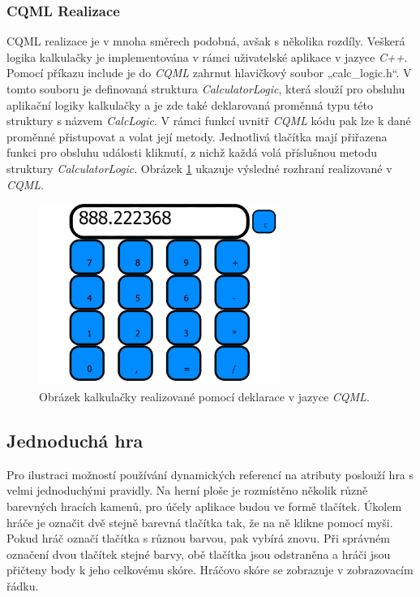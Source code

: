 \documentclass[11pt,twoside,a4paper]{book}
\begin{document}
\subsubsection{CQML Realizace}
CQML realizace je v mnoha směrech podobná, avšak s několika rozdíly. Veškerá logika kalkulačky je implementována v rámci uživatelské aplikace v jazyce \textit{C++}. Pomocí příkazu include je do \textit{CQML} zahrnut hlavičkový soubor „calc\_logic.h“. V tomto souboru je definovaná struktura \textit{CalculatorLogic}, která slouží pro obsluhu aplikační logiky kalkulačky a je zde také deklarovaná proměnná typu této struktury s názvem \textit{CalcLogic}. V rámci funkcí uvnitř \textit{CQML} kódu pak lze k dané proměnné přistupovat a volat její metody. Jednotlivá tlačítka mají přiřazena funkci pro obsluhu události kliknutí, z nichž každá volá příslušnou metodu struktury \textit{CalculatorLogic}. Obrázek \ref{fig:outCalcCQML} ukazuje výsledné rozhraní realizované v \textit{CQML}.
\begin{figure}[!ht]
\begin{center}
  \includegraphics[width=0.7\textwidth]{cqmlCalc}
\caption{{\label{fig:outCalcCQML}}Obrázek kalkulačky realizované pomocí deklarace v jazyce \textit{CQML}.}
\end{center}
\end{figure}



\subsection{Jednoduchá hra}
Pro ilustraci možností používání dynamických referencí na atributy poslouží hra s velmi jednoduchými pravidly. Na herní ploše je rozmístěno několik různě barevných hracích kamenů, pro účely aplikace budou ve formě tlačítek. Úkolem hráče je označit dvě stejně barevná tlačítka tak, že na ně klikne pomocí myši. Pokud hráč označí tlačítka s různou barvou, pak vybírá znovu. Při správném označení dvou tlačítek stejné barvy, obě tlačítka jsou odstraněna a hráči jsou přičteny body k jeho celkovému skóre. Hráčovo skóre se zobrazuje v zobrazovacím řádku.
\end{document}

